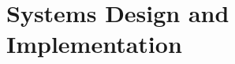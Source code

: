 \documentclass[\main/notes.tex]{subfiles}
\begin{document}
	\setcounter{chapter}{11}
	\chapter{Systems Design and Implementation}
	\vbox{}
\end{document}

